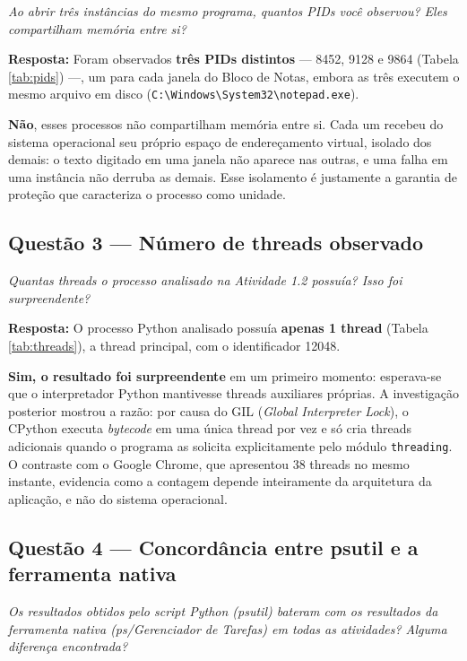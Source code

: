 \documentclass[12pt,a4paper]{article}
\begin{document}
\textit{Ao abrir três instâncias do mesmo programa, quantos PIDs você observou? Eles compartilham memória entre si?}

\textbf{Resposta:} Foram observados \textbf{três PIDs distintos} — 8452, 9128 e 9864 (Tabela \ref{tab:pids}) —, um para cada janela do Bloco de Notas, embora as três executem o mesmo arquivo em disco (\texttt{C:\textbackslash Windows\textbackslash System32\textbackslash notepad.exe}).

\textbf{Não}, esses processos não compartilham memória entre si. Cada um recebeu do sistema operacional seu próprio espaço de endereçamento virtual, isolado dos demais: o texto digitado em uma janela não aparece nas outras, e uma falha em uma instância não derruba as demais. Esse isolamento é justamente a garantia de proteção que caracteriza o processo como unidade.

\subsection{Questão 3 — Número de threads observado}

\textit{Quantas threads o processo analisado na Atividade 1.2 possuía? Isso foi surpreendente?}

\textbf{Resposta:} O processo Python analisado possuía \textbf{apenas 1 thread} (Tabela \ref{tab:threads}), a thread principal, com o identificador 12048.

\textbf{Sim, o resultado foi surpreendente} em um primeiro momento: esperava-se que o interpretador Python mantivesse threads auxiliares próprias. A investigação posterior mostrou a razão: por causa do GIL (\textit{Global Interpreter Lock}), o CPython executa \textit{bytecode} em uma única thread por vez e só cria threads adicionais quando o programa as solicita explicitamente pelo módulo \texttt{threading}. O contraste com o Google Chrome, que apresentou 38 threads no mesmo instante, evidencia como a contagem depende inteiramente da arquitetura da aplicação, e não do sistema operacional.

\subsection{Questão 4 — Concordância entre psutil e a ferramenta nativa}

\textit{Os resultados obtidos pelo script Python (psutil) bateram com os resultados da ferramenta nativa (ps/Gerenciador de Tarefas) em todas as atividades? Alguma diferença encontrada?}
\end{document}
